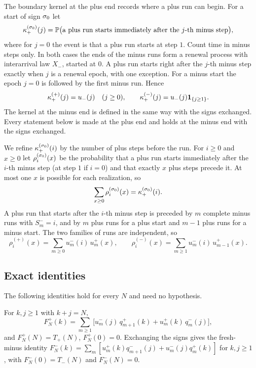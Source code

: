 The boundary kernel at the plus end records where a plus run can begin. For a
start of sign $\sigma_0$ let
\[
 \kappa^{(\sigma_0)}_{+}(j)=\mathbb{P}\bigl(\text{a plus run starts immediately after the
 $j$-th minus step}\bigr),
\]
where for $j=0$ the event is that a plus run starts at step $1$. Count time in
minus steps only. In both cases the ends of the minus runs form a renewal
process with interarrival law $X_\minus$, started at $0$. A plus run starts right
after the $j$-th minus step exactly when $j$ is a renewal epoch, with one
exception. For a minus start the epoch $j=0$ is followed by the first minus run.
Hence
\begin{equation}\label{eq:kappa}
 \kappa^{({+})}_{+}(j)=u_{-}(j)\quad(j\ge0),\qquad
 \kappa^{({-})}_{+}(j)=u_{-}(j)\mathbf{1}_{\{j\ge1\}} .
\end{equation}
The kernel at the minus end is defined in the same way with the signs exchanged.
Every statement below is made at the plus end and holds at the minus end with
the signs exchanged.

We refine $\kappa^{(\sigma_0)}_{+}(i)$ by the number of plus steps before the
run. For $i\ge0$ and $x\ge0$ let $\rho^{(\sigma_0)}_i(x)$ be the probability that a
plus run starts immediately after the $i$-th minus step (at step $1$ if $i=0$) and
that exactly $x$ plus steps precede it. At most one $x$ is possible for each
realization, so
\begin{equation}\label{eq:rho-mass}
 \sum_{x\ge0}\rho^{(\sigma_0)}_i(x)=\kappa^{(\sigma_0)}_{+}(i).
\end{equation}
A plus run that starts after the $i$-th minus step is preceded by $m$ complete
minus runs with $S^\minus_m=i$, and by $m$ plus runs for a plus start and $m-1$
plus runs for a minus start. The two families of runs are independent, so
\begin{equation}\label{eq:rho-rep}
 \rho^{(\plus)}_i(x)=\sum_{m\ge0}u^\minus_m(i)\,u^\plus_m(x),\qquad
 \rho^{(\minus)}_i(x)=\sum_{m\ge1}u^\minus_m(i)\,u^\plus_{m-1}(x).
\end{equation}

\subsection{Exact identities}\label{sec:identities}

The following identities hold for every $N$ and need no hypothesis.

\begin{proposition}\label{prop:fresh-identity}
For $k,j\ge1$ with $k+j=N$,
\[
 F^\plus_N(k)=\sum_{m\ge1}\bigl[u^\minus_m(j)\,q^\plus_{m+1}(k)+u^\plus_m(k)\,q^\minus_m(j)\bigr],
\]
and $F^\plus_N(N)=T_\plus(N)$, $F^\plus_N(0)=0$. Exchanging the signs gives the
fresh-minus identity
$F^\minus_N(k)=\sum_m[u^\plus_m(k)q^\minus_{m+1}(j)+u^\minus_m(j)q^\plus_m(k)]$ for
$k,j\ge1$, with $F^\minus_N(0)=T_\minus(N)$ and $F^\minus_N(N)=0$.
\end{proposition}


